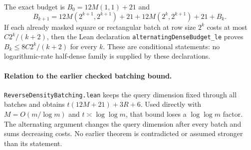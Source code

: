 \documentclass[11pt]{article}
\begin{document}
The exact budget is $B_0=12M(1,1)+21$ and
\[
 B_{k+1}=12M(2^{k+1},2^{k+1})+21+
          12M(2^k,2^{k+1})+21+B_k.
\]
If each already masked square or rectangular batch at row size $2^k$
costs at most $C2^k/(k+2)$, then the Lean declaration
\texttt{alternatingDenseBudget\_le} proves
$B_k\leq8C2^k/(k+2)$ for every $k$. These are conditional statements:
no logarithmic-rate half-dense family is supplied by these declarations.

\paragraph{Relation to the earlier checked batching bound.}
\texttt{ReverseDensityBatching.lean} keeps the query dimension fixed
through all batches and obtains $t(12M+21)+3R+6$. Used directly with
$M=O(m/\log m)$ and $t\asymp\log\log m$, that bound loses a
$\log\log m$ factor. The alternating argument changes the query
dimension after every batch and sums decreasing costs. No earlier
theorem is contradicted or assumed stronger than its statement.
\end{document}
